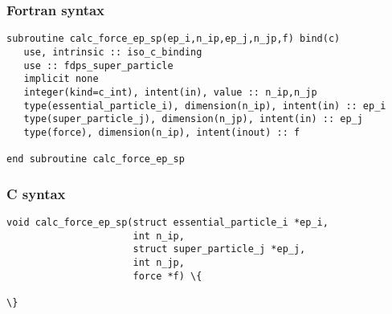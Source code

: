 \subsubsection*{Fortran syntax}
\begin{screen}
\begin{Verbatim}[commandchars=\\\{\}]
subroutine calc_force_ep_sp(ep_i,n_ip,ep_j,n_jp,f) bind(c)
   use, intrinsic :: iso_c_binding
   use :: fdps_super_particle
   implicit none
   integer(kind=c_int), intent(in), value :: n_ip,n_jp
   type(essential_particle_i), dimension(n_ip), intent(in) :: ep_i
   type(super_particle_j), dimension(n_jp), intent(in) :: ep_j
   type(force), dimension(n_ip), intent(inout) :: f
   
end subroutine calc_force_ep_sp
\end{Verbatim}
\end{screen}

\subsubsection*{C syntax}
\begin{screen}
\begin{Verbatim}[commandchars=\\\{\}]
void calc_force_ep_sp(struct essential_particle_i *ep_i,
                      int n_ip,
                      struct super_particle_j *ep_j,
                      int n_jp,
                      force *f) \{
   
\}
\end{Verbatim}
\end{screen}

